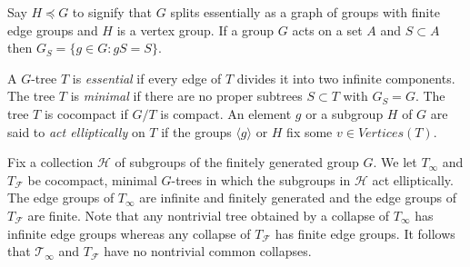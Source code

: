\documentclass[12pt]{article}
\begin{document}
Say  $H\preceq G$ to signify that $G$ splits essentially as a graph of groups with finite edge groups and $H$ is a vertex group. If a group $G$ acts on a set $A$ and $S\subset A$ then $G_S=\{g\in G : gS=S\}$.

A $G$-tree $T$ is {\it essential} if every edge of $T$ divides it into two infinite components. The tree $T$ is {\it minimal} if there are no proper subtrees $S\subset T$ with $G_S = G$. The tree $T$ is cocompact if $G/T$ is compact. An element $g$ or a subgroup $H$ of $G$ are said to {\it act  elliptically} on $T$ if the groups $\langle g\rangle$  or $H$ fix some $v\in  Vertices(T )$.


Fix a collection $\mathcal H$ of subgroups of the finitely generated group $G$. We let $T_\infty$  and $T_{ \mathcal F}$ be cocompact, minimal $G$-trees in which the subgroups in $\mathcal H$ act elliptically. The edge groups of $T_\infty$  are infinite and finitely generated and the edge groups of $T_{\mathcal F}$  are finite. Note that any nontrivial tree obtained by a collapse of $T_\infty$ has infinite edge groups whereas any collapse of $T_{\mathcal F}$ has finite edge groups. It follows that $\mathcal T_\infty$  and $T_{\mathcal F}$ have no nontrivial common collapses.%
\end{document}
